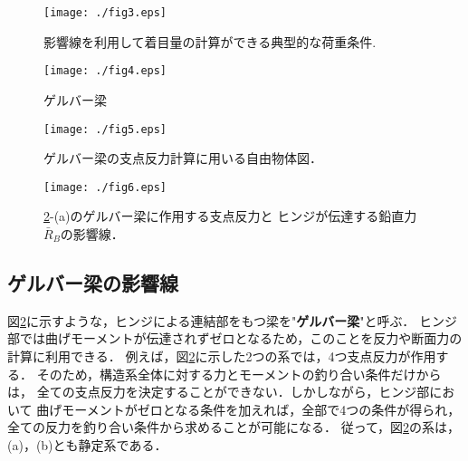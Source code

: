 \documentclass[10pt,a4j]{jbook}
\begin{document}
\begin{figure}[h]
	\begin{center}
	\texttt{[image: ./fig3.eps]} 
	\end{center}
	\caption{
		影響線を利用して着目量の計算ができる典型的な荷重条件.
	} 
	\label{fig:fig13_3}
\end{figure}
\begin{figure}[h]
	\begin{center}
	\texttt{[image: ./fig4.eps]} 
	\end{center}
	\caption{
		ゲルバー梁
	} 
	\label{fig:fig13_4}
\end{figure}
\begin{figure}[h]
	\begin{center}
	\texttt{[image: ./fig5.eps]} 
	\end{center}
	\caption{
		ゲルバー梁の支点反力計算に用いる自由物体図．
	} 
	\label{fig:fig13_5}
\end{figure}
\begin{figure}[h]
	\begin{center}
	\texttt{[image: ./fig6.eps]} 
	\end{center}
	\caption{
		\ref{fig:fig13_4}-(a)のゲルバー梁に作用する支点反力と
		ヒンジが伝達する鉛直力$\bar R_B$の影響線．
	} 
	\label{fig:fig13_6}
\end{figure}
\subsection{ゲルバー梁の影響線}
図\ref{fig:fig13_4}に示すような，ヒンジによる連結部をもつ梁を"{\bf ゲルバー梁}"と呼ぶ．
ヒンジ部では曲げモーメントが伝達されずゼロとなるため，このことを反力や断面力の計算に利用できる．
例えば，図\ref{fig:fig13_4}に示した2つの系では，4つ支点反力が作用する．
そのため，構造系全体に対する力とモーメントの釣り合い条件だけからは，
全ての支点反力を決定することができない．しかしながら，ヒンジ部において
曲げモーメントがゼロとなる条件を加えれば，全部で4つの条件が得られ，
全ての反力を釣り合い条件から求めることが可能になる．
従って，図\ref{fig:fig13_4}の系は，(a)，(b)とも静定系である．\\
\end{document}
